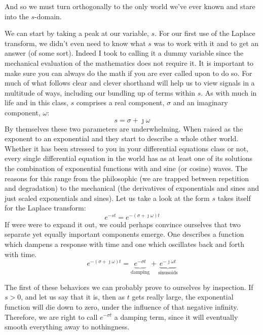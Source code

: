 \documentclass[11pt]{book}
\begin{document}
And so we must turn orthogonally to the only world we've ever known and stare into the $s$-domain.

We can start by taking a peak at our variable, $s$. For our first use of the Laplace transform, we didn't even need to know what $s$ was to work with it and to get an answer (of some sort). Indeed I took to calling it a dummy variable since the mechanical evaluation of the mathematics does not require it. It is important to make sure you can always do the math if you are ever called upon to do so. For much of what follows clear and clever shorthand will help us to view signals in a multitude of ways, including our bundling up of terms within $s$. As with much in life and in this class, $s$ comprises a real component, $\sigma$ and an imaginary component, $\omega$:
\begin{equation}
	s = \sigma + \jmath \omega 
\end{equation}
By themselves these two parameters are underwhelming. When raised as the exponent to an exponential and they start to describe a whole other world. Whether it has been stressed to you in your differential equations class or not, every single differential equation in the world has as at least one of its solutions the combination of exponential functions with and sine (or cosine) waves. The reasons for this range from the philosophic (we are trapped between repetition and degradation) to the mechanical (the derivatives of exponentials and sines and just scaled exponentials and sines). Let us take a look at the form $s$ takes itself for the Laplace transform:
\begin{equation}
	e^{-st} = e^{-(\sigma + \jmath \omega)t} 
\end{equation}
If were were to expand it out, we could perhaps convince ourselves that two separate yet equally important components emerge. One describes a function which dampens a response with time and one which oscillates back and forth with time.
\begin{equation}
	e^{-(\sigma + \jmath \omega)t}= \underbrace{e^{-\sigma t}}_{\text{damping}} + \underbrace{e^{-\jmath \omega t}}_{\text{sinusoids}}
\end{equation} 

The first of these behaviors we can probably prove to ourselves by inspection. If $s >0$, and let us say that it is, then as $t$ gets really large, the exponential function will die down to zero, under the influence of that negative infinity. Therefore, we are right to call $e^{-\sigma t}$ a damping term, since it will eventually smooth everything away to nothingness.
\end{document}
